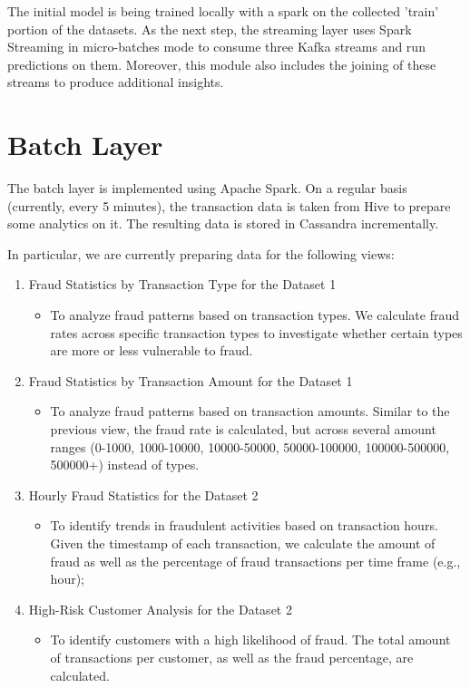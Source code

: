 \documentclass[12pt,a4paper, hidelinks]{article}
\begin{document}
The initial model is being trained locally with a spark on the collected 'train' portion of the datasets.
As the next step, the streaming layer uses Spark Streaming in micro-batches mode to consume three Kafka streams and run predictions on them. Moreover, this module also includes the joining of these streams to produce additional insights.

\section{Batch Layer}

The batch layer is implemented using Apache Spark. On a regular basis (currently, every 5 minutes), the transaction data is taken from Hive to prepare some analytics on it. The resulting data is stored in Cassandra incrementally.

In particular, we are currently preparing data for the following views:
\begin{enumerate}
    \item Fraud Statistics by Transaction Type for the Dataset 1
    \begin{itemize}
        \item To analyze fraud patterns based on transaction types. We calculate fraud rates across specific transaction types to investigate whether certain types are more or less vulnerable to fraud.
    \end{itemize}
    \item Fraud Statistics by Transaction Amount for the Dataset 1
    \begin{itemize}
        \item To analyze fraud patterns based on transaction amounts. Similar to the previous view, the fraud rate is calculated, but across several amount ranges (0-1000, 1000-10000, 10000-50000, 50000-100000, 100000-500000, 500000+) instead of types.
    \end{itemize}
    \item Hourly Fraud Statistics for the Dataset 2
    \begin{itemize}
        \item To identify trends in fraudulent activities based on transaction hours. Given the timestamp of each transaction, we calculate the  amount of fraud as well as the percentage of fraud transactions per time frame (e.g., hour);
    \end{itemize}
    \item High-Risk Customer Analysis for the Dataset 2
    \begin{itemize}
        \item To identify customers with a high likelihood of fraud. The total amount of transactions per customer, as well as the fraud percentage, are calculated.
    \end{itemize}
\end{enumerate}
\end{document}
